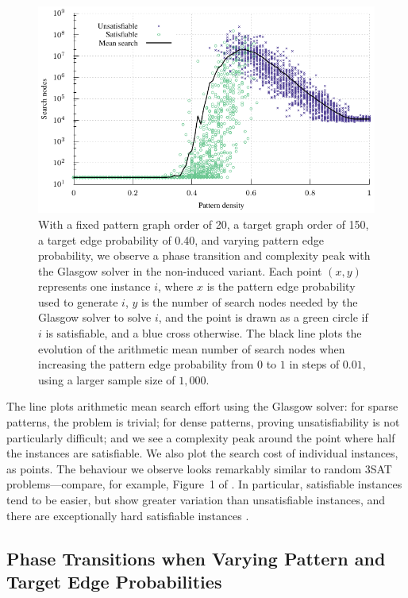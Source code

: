 \documentclass[twoside,11pt]{article}
\begin{document}
\begin{figure}[t]
    \centering
    \includegraphics*{plots/phase-transition.pdf}

    \caption{With a fixed pattern graph order of 20, a target graph order of 150, a target edge
    probability of 0.40, and varying pattern edge probability, we observe a phase transition and
    complexity peak with the Glasgow solver in the non-induced variant. Each point $(x, y)$
    represents one instance $i$, where $x$ is the pattern edge probability used to generate $i$, $y$
    is the number of search nodes needed by the Glasgow solver to solve $i$, and the point is drawn
    as a green circle if $i$ is satisfiable, and a blue cross otherwise. The black line plots the
    evolution of the arithmetic mean number of search nodes when increasing the pattern edge probability from
    $0$ to $1$ in steps of $0.01$, using a larger sample size of $1,000$.}
    \label{figure:phase-transition}
\end{figure}

The line plots arithmetic mean search effort using the Glasgow solver: for sparse patterns, the problem is
trivial; for dense patterns, proving unsatisfiability is not particularly difficult; and we see a
complexity peak around the point where half the instances are satisfiable.  We also plot the search
cost of individual instances, as points. The behaviour we observe looks remarkably similar to random
3SAT problems---compare, for example, Figure~1 of . In
particular, satisfiable instances tend to be easier, but show greater variation than unsatisfiable
instances, and there are exceptionally hard satisfiable instances \cite{DBLP:conf/cp/SmithG97}.

\subsection{Phase Transitions when Varying Pattern and Target Edge Probabilities}
\end{document}
